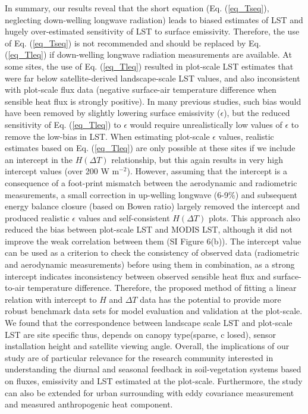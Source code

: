\documentclass[fleqn,10pt]{wlscirep}
\begin{document}
In summary, our results reveal that the short equation (Eq. (\ref{eq_Tseq}), neglecting down-welling longwave radiation) leads to biased estimates of LST and hugely over-estimated sensitivity of LST to surface emissivity. Therefore, the use of Eq. (\ref{eq_Tseq}) is not recommended and should be replaced by Eq. (\ref{eq_Tleq}) if down-welling longwave radiation measurements are available. At some sites, the use of Eq. (\ref{eq_Tleq}) resulted in plot-scale LST estimates that were far below satellite-derived landscape-scale LST values, and also inconsistent with plot-scale flux data (negative surface-air temperature difference when sensible heat flux is strongly positive). In many previous studies, such bias would have been removed by slightly lowering surface emissivity ($\epsilon$), but the reduced sensitivity of Eq. (\ref{eq_Tleq}) to $\epsilon$ would require unrealistically low values of $\epsilon$ to remove the low-bias in LST. When estimating plot-scale $\epsilon$ values, realistic estimates based on Eq. (\ref{eq_Tleq}) are only possible at these sites if we include an intercept in the $H (\Delta T)$ relationship, but this again results in very high intercept values (over 200 W m$^{-2}$). However, assuming that the intercept is a consequence of a foot-print mismatch between the aerodynamic and radiometric measurements, a small correction in up-welling longwave (6-9\%) and subsequent energy balance closure (based on Bowen ratio) largely removed the intercept and produced realistic $\epsilon$ values and self-consistent $H(\Delta T)$ plots. This approach also reduced the bias between plot-scale LST and MODIS LST, although it did not improve the weak correlation between them (SI Figure 6(b)). The intercept value can be used as a criterion to check the consistency of observed data (radiometric and aerodynamic measurements) before using them in combination, as a strong intercept indicates inconsistency between observed sensible heat flux and surface-to-air temperature difference. Therefore, the proposed method of fitting a linear relation with intercept to $H$ and $\Delta T$ data has the potential to provide more robust benchmark data sets for model evaluation and validation at the plot-scale. We found that the  correspondence between landscape scale LST and plot-scale LST are site specific thus, depends on canopy type(sparse, c losed), sensor installation height and satellite viewing angle. Overall, the implications of our study are of particular relevance for the research community interested in understanding the diurnal and seasonal feedback in soil-vegetation systems based on fluxes, emissivity and LST estimated at the plot-scale. Furthermore, the study can also be extended for urban surrounding with eddy covariance measurement and measured anthropogenic heat component.
\end{document}
